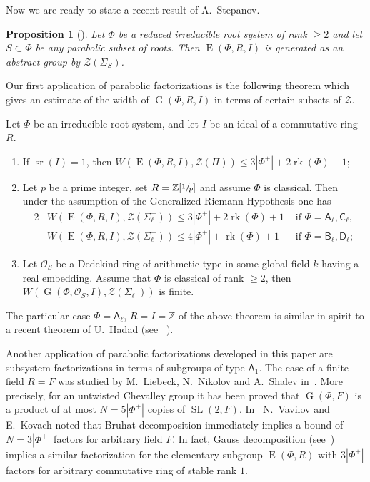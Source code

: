 \documentclass[12pt]{amsart}
\theoremstyle{plain} \declaretheorem[name=Theorem, Refname={Theorem,Theorems}]{thm} \Crefname{thm}{Theorem}{Theorems}
\numberwithin{equation}{section}
\newtheorem{prop}[lemma]{Proposition} \Crefname{prop}{Proposition}{Propositions}
\theoremstyle{definition} \newtheorem{dfn}[lemma]{Definition} \Crefname{dfn}{Definition}{Definitions}
\theoremstyle{remark} \newtheorem{rem}[lemma]{Remark} \Crefname{rem}{Remark}{Remarks}
\DeclareMathOperator{\G}{G}
\DeclareMathOperator{\SL}{SL}
\DeclareMathOperator{\E}{E}
\DeclareMathOperator{\sr}{sr}
\DeclareMathOperator{\rk}{rk}
\newcommand{\rA}{\mathsf{A}}
\newcommand{\rB}{\mathsf{B}}
\newcommand{\rC}{\mathsf{C}}
\newcommand{\rD}{\mathsf{D}}
\begin{document}
Now we are ready to state a recent result of A.~Stepanov.  
\begin{prop}[{\cite[Theorem~3.4]{S}}] \label{prop:Stepanov}
Let $\Phi$ be a reduced irreducible root system of rank $\geq 2$ and let $S \subset \Phi$ be any parabolic subset of roots.
Then $\E(\Phi, R, I)$ is generated as an abstract group by $\mathcal{Z}(\Sigma_S)$.
\end{prop}

Our first application of parabolic factorizations is the following theorem which gives an estimate of the width of $\G(\Phi, R, I)$ in terms of certain subsets of $\mathcal{Z}$.
\begin{thm}\label{thm:width} Let $\Phi$ be an irreducible root system, and let $I$ be an ideal of a commutative ring $R$.
\begin{enumerate}
\item If $\sr(I) = 1$, then $W(\E(\Phi,R,I),\mathcal{Z}(\Pi))\leqslant 3|\Phi^+|+2\rk(\Phi)-1$;
\item Let $p$ be a prime integer, set $R = \mathbb{Z}[\sfrac{1}{p}]$ and assume $\Phi$ is classical. Then under the assumption of the Generalized Riemann Hypothesis one has
\begin{alignat*}{2}
& W(\E(\Phi,R,I), \mathcal{Z}(\Sigma_\ell^-))\leqslant 3|\Phi^+| + 2\rk(\Phi) + 1 & \text{ if } \Phi=\rA_\ell,\rC_\ell, \\
& W(\E(\Phi,R,I), \mathcal{Z}(\Sigma_\ell^-))\leqslant 4|\Phi^+| + \rk(\Phi) + 1 & \text{ if } \Phi=\rB_\ell,\rD_\ell;
\end{alignat*}
\item Let $\mathcal{O}_S$ be a Dedekind ring of arithmetic type in some global field $k$ having a real embedding. 
Assume that $\Phi$ is classical of rank $\geqslant2$, then $W(\G(\Phi,\mathcal{O}_S,I), \mathcal{Z}(\Sigma_\ell^-))$ is finite.
\end{enumerate}
\end{thm}
The particular case $\Phi = \rA_\ell$, $R = I = \mathbb{Z}$ of the above theorem is similar in spirit to a recent theorem of U.~Hadad (see ~\cite[Theorem~1.6]{Ha12}).

Another application of parabolic factorizations developed in this paper are subsystem factorizations in terms of subgroups of type $\rA_1$.
The case of a finite field $R=F$ was studied by M.~Liebeck, N.~Nikolov and A.~Shalev in~\cite{LiebNikShaSL2}.
More precisely, for an untwisted Chevalley group it has been proved that $\G(\Phi, F)$ is a product of at most $N=5|\Phi^+|$ copies of $\SL(2, F)$.
In~\cite{VavKovSL2} N.~Vavilov and E.~Kovach noted that Bruhat decomposition immediately implies a bound of $N=3|\Phi^+|$ factors for arbitrary field $F$.
In fact, Gauss decomposition (see~\cite{Sm12}) implies a similar factorization for the elementary subgroup $\E(\Phi, R)$ 
with $3|\Phi^+|$ factors for arbitrary commutative ring of stable rank $1$.
\end{document}
